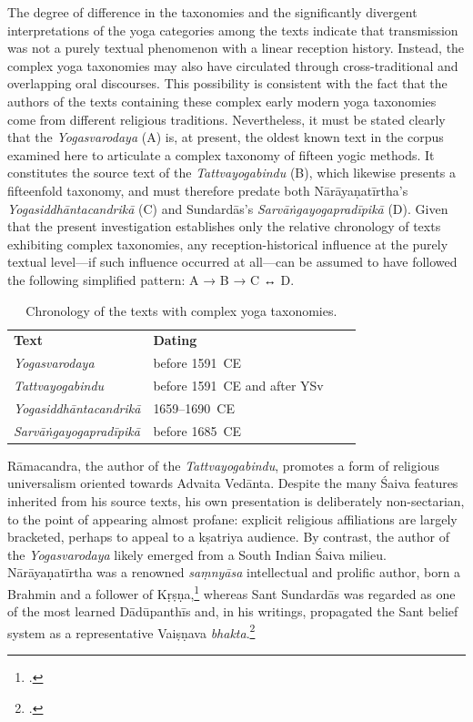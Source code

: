 The degree of difference in the taxonomies and the significantly divergent interpretations of the yoga categories among the texts indicate that transmission was not a purely textual phenomenon with a linear reception history. Instead, the complex yoga taxonomies may also have circulated through cross-traditional and overlapping oral discourses. This possibility is consistent with the fact that the authors of the texts containing these complex early modern yoga taxonomies come from different religious traditions. Nevertheless, it must be stated clearly that the \emph{Yogasvarodaya} (A) is, at present, the oldest known text in the corpus examined here to articulate a complex taxonomy of fifteen yogic methods. It constitutes the source text of the \emph{Tattvayogabindu} (B), which likewise presents a fifteenfold taxonomy, and must therefore predate both Nārāyaṇatīrtha’s \emph{Yogasiddhāntacandrikā} (C) and Sundardās’s \emph{Sarvāṅgayogapradīpikā} (D). Given that the present investigation establishes only the relative chronology of texts exhibiting complex taxonomies, any reception-historical influence at the purely textual level---if such influence occurred at all---can be assumed to have followed the following simplified pattern: A → B → C ↔ D.

    \tiny
  \begin{table}[H]
  \begin{tabular}{llll}
\textbf{Text}         & \textbf{Dating}          \\
\textit{Yogasvarodaya}            & before 1591~CE   \\
\textit{Tattvayogabindu}          & before 1591~CE and after YSv \\
\textit{Yogasiddhāntacandrikā}    & 1659–1690~CE \\
\textit{Sarvāṅgayogapradīpikā}    & before 1685~CE \\
\end{tabular}
\caption{Chronology of the texts with complex yoga taxonomies.}
\label{tab:textetaxo1}
\end{table}
\normalsize

Rāmacandra, the author of the \textit{Tattvayogabindu}, promotes a form of religious universalism oriented towards Advaita Vedānta. Despite the many Śaiva features inherited from his source texts, his own presentation is deliberately non-sectarian, to the point of appearing almost profane: explicit religious affiliations are largely bracketed, perhaps to appeal to a kṣatriya audience. By contrast, the author of the \textit{Yogasvarodaya} likely emerged from a South Indian Śaiva milieu. Nārāyaṇatīrtha was a renowned \textit{saṃnyāsa} intellectual and prolific author, born a Brahmin and a follower of Kṛṣṇa,\footnote{\citeauthor[1993: 41]{endo1993}.} whereas Sant Sundardās was regarded as one of the most learned Dādūpanthīs and, in his writings, propagated the Sant belief system as a representative Vaiṣṇava \textit{bhakta}.\footnote{\citeauthor[2023: 84–87]{horstmann2023shrine}.}

